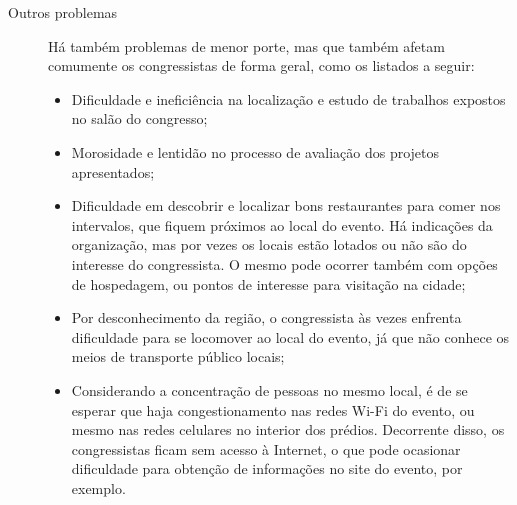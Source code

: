 \documentclass[12pt,a4paper,twoside,hyphens,english,brazil]{abntex2}
\newcommand{\hip}{{\color{BlueViolet}\framebox[1.1\width]{HIP}}}
\begin{document}
\begin{description}
\item[Outros problemas] Há também problemas de menor porte, mas que também afetam comumente os congressistas de forma geral, como os listados a seguir:
	\begin{itemize}[itemsep=-1ex]
		\item \hip{} Dificuldade e ineficiência na localização e estudo de trabalhos expostos no salão do congresso;
		\item \hip{} Morosidade e lentidão no processo de avaliação dos projetos apresentados;
		\item \hip{} Dificuldade em descobrir e localizar bons restaurantes para comer nos intervalos, que fiquem próximos ao local do evento. Há indicações da organização, mas por vezes os locais estão lotados ou não são do interesse do congressista. O mesmo pode ocorrer também com opções de hospedagem, ou pontos de interesse para visitação na cidade;
		\item \hip{} Por desconhecimento da região, o congressista às vezes enfrenta dificuldade para se locomover ao local do evento, já que não conhece os meios de transporte público locais;
		\item \hip{} Considerando a concentração de pessoas no mesmo local, é de se esperar que haja congestionamento nas redes Wi-Fi do evento, ou mesmo nas redes celulares no interior dos prédios. Decorrente disso, os congressistas ficam sem acesso à Internet, o que pode ocasionar dificuldade para obtenção de informações no site do evento, por exemplo.
	\end{itemize}
\end{description}
\end{document}
